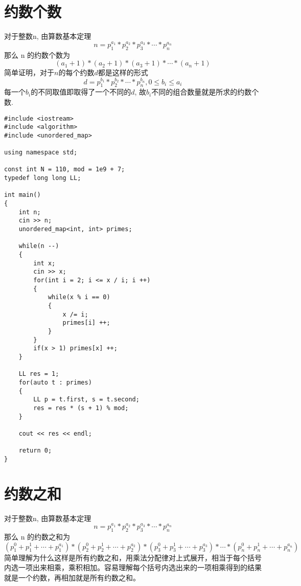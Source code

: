 \documentclass[]{book}
\begin{document}
\section{约数个数}
对于整数n, 由算数基本定理
\[n = p_{1}^{a_{1}} * p_{2}^{a_{2}} * p_{3}^{a_{3}} *\cdots* p_{n}^{a_{n}}\]
那么 n 的约数个数为
\[(a_{1} + 1) * (a_{2} + 1) * (a_{3} + 1) *\cdots* (a_{n} + 1)\]
简单证明，对于$n$的每个约数$d$都是这样的形式
\[d = p_{1}^{b_{1}} * p_{2}^{b_{2}} *\cdots* p_{n}^{b_{n}}, 0 \leq b_{i} \leq a_{i}\]
每一个$b_{i}$的不同取值即取得了一个不同的$d$, 故$b_{i}$不同的组合数量就是所求的约数个数.
\begin{lstlisting}
#include <iostream>
#include <algorithm>
#include <unordered_map>

using namespace std;

const int N = 110, mod = 1e9 + 7;
typedef long long LL;

int main()
{
    int n;
    cin >> n;
    unordered_map<int, int> primes;
    
    while(n --)
    {
        int x;
        cin >> x;
        for(int i = 2; i <= x / i; i ++)
        {
            while(x % i == 0)
            {
                x /= i;
                primes[i] ++;
            }
        }
        if(x > 1) primes[x] ++;
    }
    
    LL res = 1;
    for(auto t : primes)
    {
        LL p = t.first, s = t.second;
        res = res * (s + 1) % mod;
    }
    
    cout << res << endl;
    
    return 0;
}
\end{lstlisting}
\section{约数之和}
对于整数n, 由算数基本定理
\[n = p_{1}^{a_{1}} * p_{2}^{a_{2}} * p_{3}^{a_{3}} *\cdots* p_{n}^{a_{n}}\]
那么 n 的约数之和为
\[(p_{1}^{0} + p_{1}^{1} + \cdots + p_{1}^{a_{1}}) * (p_{2}^{0} + p_{2}^{1} + \cdots + p_{2}^{a_{2}}) * (p_{3}^{0} + p_{3}^{1} + \cdots + p_{3}^{a_{3}}) *\cdots*(p_{n}^{0} + p_{n}^{1} + \cdots + p_{n}^{a_{n}})\]
简单理解为什么这样是所有约数之和，用乘法分配律对上式展开，相当于每个括号内选一项出来相乘，乘积相加。容易理解每个括号内选出来的一项相乘得到的结果就是一个约数，再相加就是所有约数之和。
\end{document}
